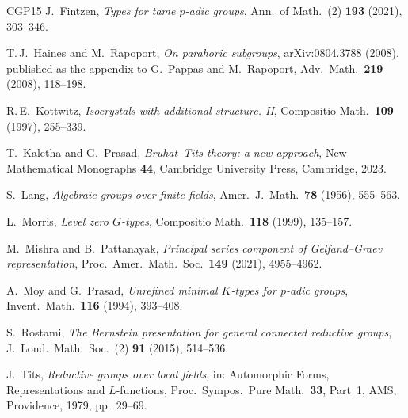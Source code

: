 \documentclass[11pt]{amsart}
\theoremstyle{definition}
\theoremstyle{remark}
\begin{document}
\begin{thebibliography}{CGP15}
 J.~Fintzen, \emph{Types for tame $p$-adic groups}, Ann.\ of Math.\ (2) \textbf{193} (2021), 303--346.

 T.\,J.~Haines and M.~Rapoport, \emph{On parahoric subgroups}, arXiv:0804.3788 (2008), published as the appendix to G.~Pappas and M.~Rapoport, Adv.\ Math.\ \textbf{219} (2008), 118--198.

 R.\,E.~Kottwitz, \emph{Isocrystals with additional structure. II}, Compositio Math.\ \textbf{109} (1997), 255--339.

 T.~Kaletha and G.~Prasad, \emph{Bruhat--Tits theory: a new approach}, New Mathematical Monographs \textbf{44}, Cambridge University Press, Cambridge, 2023.

 S.~Lang, \emph{Algebraic groups over finite fields}, Amer.\ J.\ Math.\ \textbf{78} (1956), 555--563.

 L.~Morris, \emph{Level zero $G$-types}, Compositio Math.\ \textbf{118} (1999), 135--157.

 M.~Mishra and B.~Pattanayak, \emph{Principal series component of Gelfand--Graev representation}, Proc.\ Amer.\ Math.\ Soc.\ \textbf{149} (2021), 4955--4962.

 A.~Moy and G.~Prasad, \emph{Unrefined minimal $K$-types for $p$-adic groups}, Invent.\ Math.\ \textbf{116} (1994), 393--408.

 S.~Rostami, \emph{The Bernstein presentation for general connected reductive groups}, J.~Lond.\ Math.\ Soc.\ (2) \textbf{91} (2015), 514--536.

 J.~Tits, \emph{Reductive groups over local fields}, in: Automorphic Forms, Representations and $L$-functions, Proc.\ Sympos.\ Pure Math.\ \textbf{33}, Part~1, AMS, Providence, 1979, pp.~29--69.

\end{thebibliography}
\end{document}
